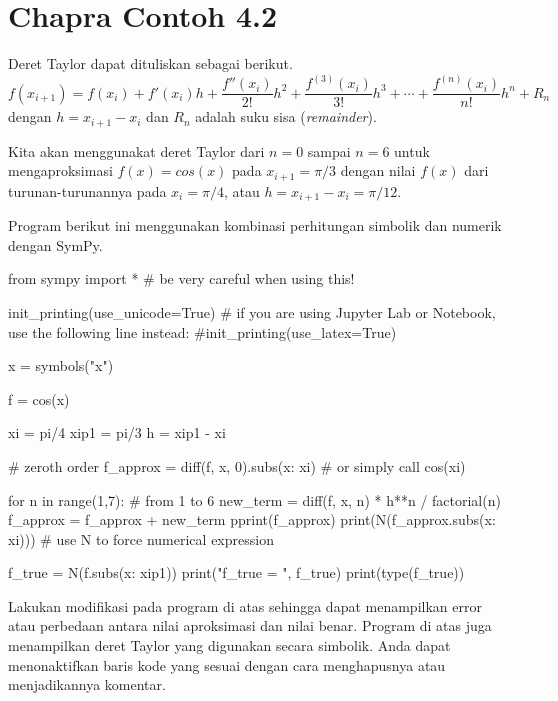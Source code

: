 \section{Chapra Contoh 4.2}

Deret Taylor dapat dituliskan sebagai berikut.
\begin{equation}
f(x_{i+1}) = f(x_{i}) + f'(x_{i}) h + \frac{f''(x_{i})}{2!}h^2 + 
\frac{f^{(3)}(x_{i})}{3!}h^3 + \cdots +
\frac{f^{(n)}(x_{i})}{n!}h^n + R_{n}
\end{equation}
dengan $h = x_{i+1} - x_{i}$ dan $R_{n}$ adalah suku sisa (\textit{remainder}).

Kita akan menggunakat deret Taylor dari $n=0$ sampai $n=6$ untuk mengaproksimasi
$f(x) = cos(x)$ pada $x_{i+1} = \pi/3$ dengan nilai $f(x)$ dari turunan-turunannya
pada $x_{i} = \pi/4$, atau $h = x_{i+1} - x_{i} = \pi/12$.

Program berikut ini menggunakan kombinasi perhitungan simbolik dan numerik
dengan SymPy.
\begin{pythoncode}
from sympy import * # be very careful when using this!

init_printing(use_unicode=True)
# if you are using Jupyter Lab or Notebook, use the following line instead:
#init_printing(use_latex=True)

x = symbols("x")

f = cos(x)

xi = pi/4
xip1 = pi/3
h = xip1 - xi

# zeroth order
f_approx = diff(f, x, 0).subs({x: xi}) # or simply call cos(xi)

for n in range(1,7): # from 1 to 6
  new_term = diff(f, x, n) * h**n / factorial(n)
  f_approx = f_approx + new_term
  pprint(f_approx)
  print(N(f_approx.subs({x: xi}))) # use N to force numerical expression

f_true = N(f.subs({x: xip1}))
print("f_true = ", f_true)
print(type(f_true))
\end{pythoncode}


\begin{soal}
Lakukan modifikasi pada program di atas sehingga dapat menampilkan error atau
perbedaan antara nilai aproksimasi dan nilai benar. Program di atas juga menampilkan
deret Taylor yang digunakan secara simbolik. Anda dapat menonaktifkan baris
kode yang sesuai dengan cara menghapusnya atau menjadikannya komentar.
\end{soal}
